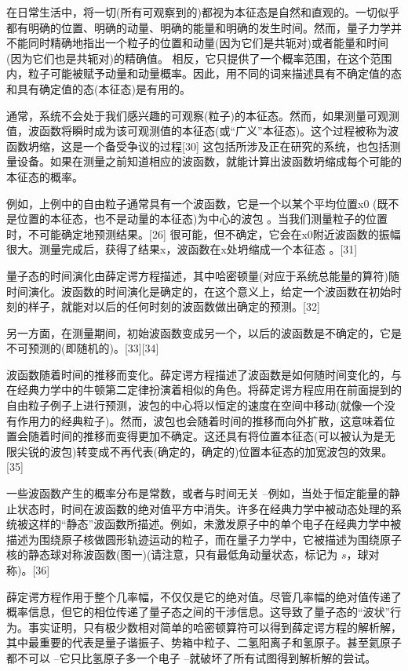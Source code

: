在日常生活中，将一切(所有可观察到的)都视为本征态是自然和直观的。一切似乎都有明确的位置、明确的动量、明确的能量和明确的发生时间。然而，量子力学并不能同时精确地指出一个粒子的位置和动量(因为它们是共轭对)或者能量和时间(因为它们也是共轭对)的精确值。 相反，它只提供了一个概率范围，在这个范围内，粒子可能被赋予动量和动量概率。因此，用不同的词来描述具有不确定值的态和具有确定值的态(本征态)是有用的。

通常，系统不会处于我们感兴趣的可观察(粒子)的本征态。然而，如果测量可观测值，波函数将瞬时成为该可观测值的本征态(或“广义”本征态)。这个过程被称为波函数坍缩，这是一个备受争议的过程[30] 这包括所涉及正在研究的系统，也包括测量设备。如果在测量之前知道相应的波函数，就能计算出波函数坍缩成每个可能的本征态的概率。

例如，上例中的自由粒子通常具有一个波函数，它是一个以某个平均位置x0 (既不是位置的本征态，也不是动量的本征态)为中心的波包 。当我们测量粒子的位置时，不可能确定地预测结果。[26] 很可能，但不确定，它会在x0附近波函数的振幅很大。测量完成后，获得了结果x，波函数在x处坍缩成一个本征态 。[31]

量子态的时间演化由薛定谔方程描述，其中哈密顿量(对应于系统总能量的算符)随时间演化。波函数的时间演化是确定的，在这个意义上，给定一个波函数在初始时刻的样子，就能对以后的任何时刻的波函数做出确定的预测。[32]

另一方面，在测量期间，初始波函数变成另一个，以后的波函数是不确定的，它是不可预测的(即随机的)。[33][34]

波函数随着时间的推移而变化。薛定谔方程描述了波函数是如何随时间变化的，与在经典力学中的牛顿第二定律扮演着相似的角色。将薛定谔方程应用在前面提到的自由粒子例子上进行预测，波包的中心将以恒定的速度在空间中移动(就像一个没有作用力的经典粒子)。然而，波包也会随着时间的推移而向外扩散，这意味着位置会随着时间的推移而变得更加不确定。这还具有将位置本征态(可以被认为是无限尖锐的波包)转变成不再代表(确定的，确定的)位置本征态的加宽波包的效果。[35]

一些波函数产生的概率分布是常数，或者与时间无关 –例如，当处于恒定能量的静止状态时，时间在波函数的绝对值平方中消失。许多在经典力学中被动态处理的系统被这样的“静态”波函数所描述。例如，未激发原子中的单个电子在经典力学中被描述为围绕原子核做圆形轨迹运动的粒子，而在量子力学中，它被描述为围绕原子核的静态球对称波函数(图一)(请注意，只有最低角动量状态，标记为 $s$，球对称)。[36]

薛定谔方程作用于整个几率幅，不仅仅是它的绝对值。尽管几率幅的绝对值传递了概率信息，但它的相位传递了量子态之间的干涉信息。这导致了量子态的“波状”行为。事实证明，只有极少数相对简单的哈密顿算符可以得到薛定谔方程的解析解，其中最重要的代表是量子谐振子、势箱中粒子、二氢阳离子和氢原子。甚至氦原子都不可以 –它只比氢原子多一个电子 –就破坏了所有试图得到解析解的尝试。


